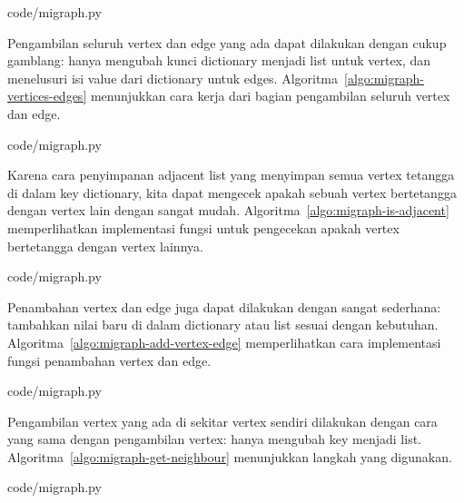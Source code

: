 
                {code/migraph.py}

Pengambilan seluruh vertex dan edge yang ada dapat dilakukan dengan cukup gamblang: hanya mengubah kunci dictionary menjadi list untuk vertex, dan menelusuri isi value dari dictionary untuk edges. Algoritma~\ref{algo:migraph-vertices-edges} menunjukkan cara kerja dari bagian pengambilan seluruh vertex dan edge.


                {code/migraph.py}

Karena cara penyimpanan adjacent list yang menyimpan semua vertex tetangga di dalam key dictionary, kita dapat mengecek apakah sebuah vertex bertetangga dengan vertex lain dengan sangat mudah. Algoritma~\ref{algo:migraph-is-adjacent} memperlihatkan implementasi fungsi untuk pengecekan apakah vertex bertetangga dengan vertex lainnya.


                {code/migraph.py}

Penambahan vertex dan edge juga dapat dilakukan dengan sangat sederhana: tambahkan nilai baru di dalam dictionary atau list sesuai dengan kebutuhan. Algoritma~\ref{algo:migraph-add-vertex-edge} memperlihatkan cara implementasi fungsi penambahan vertex dan edge.


                {code/migraph.py}

Pengambilan vertex yang ada di sekitar vertex sendiri dilakukan dengan cara yang sama dengan pengambilan vertex: hanya mengubah key menjadi list. Algoritma~\ref{algo:migraph-get-neighbour} menunjukkan langkah yang digunakan.


                {code/migraph.py}

